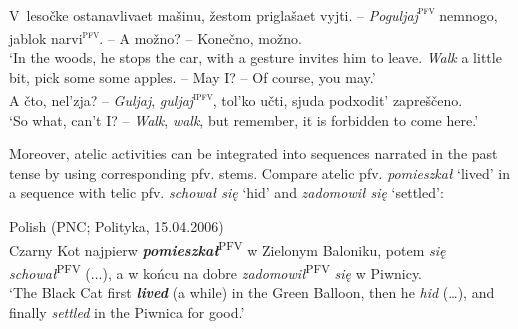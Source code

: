 \documentclass[output=paper]{langscibook}
\begin{document}
 \\ 
\ea 
    V~lesočke ostanavlivaet mašinu, žestom priglašaet vyjti. – \textit{Poguljaj}\textsc{\textsuperscript{pfv}} nemnogo, jablok narvi\textsc{\textsuperscript{pfv}}. – A možno? – Konečno, možno.\\
    \glt ‘In the woods, he stops the car, with a gesture invites him to leave. \textit{Walk} a little bit, pick some some apples. – May I? – Of course, you may.’ \label{ex:wiemer:14a} \\
\ex \label{ex:wiemer:14b} A čto, nel’zja? – \textit{Guljaj}, \textit{guljaj}\textsc{\textsuperscript{ipfv}}, tol’ko učti, sjuda podxodit’ zapreščeno.\\ 
    \glt ‘So what, can’t I? – \textit{Walk}, \textit{walk}, but remember, it is forbidden to come here.’     
     \z\z

\noindent Moreover, atelic activities can be integrated into sequences narrated in the past tense by using corresponding pfv. stems. Compare atelic pfv. \textit{pomieszkał} ‘lived’ in a sequence with telic pfv. \textit{schował się} ‘hid’ and \textit{zadomowił się} ‘settled’:

\ea\label{ex:wiemer:15}Polish (PNC; Polityka, 15.04.2006)\\ 
Czarny Kot najpierw \textbf{\textit{pomieszkał}}\textsuperscript{PFV} w Zielonym Baloniku, potem \textit{się} \textit{schował}\textsuperscript{PFV} (...), a w końcu na   dobre \textit{zadomowił}\textsuperscript{PFV} \textit{się} w Piwnicy.\\
\glt‘The Black Cat first \textbf{\textit{lived}} (a while) in the Green Balloon, then he \textit{hid} (…), and finally \textit{settled} in the Piwnica for good.’\\
\z
\end{document}
